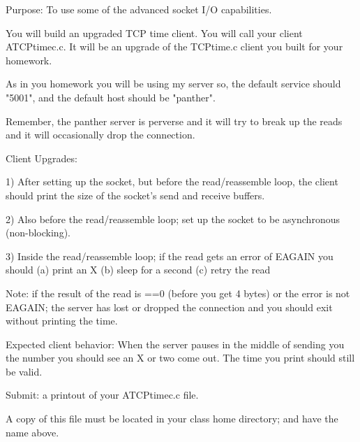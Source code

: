 

\parindent 0pt

Purpose: To use some of the advanced socket I/O capabilities.

You will build an upgraded TCP time client.
You will call your client {\ltt{}ATCPtimec.c}.
It will be an upgrade of the {\ltt{}TCPtime.c} client you built
for your homework.

As in you homework you will be using my server so,
the default service should {\ltt{}"5001"},
and the default host should be {\ltt{}"panther"}.

Remember, the {\ltt{}panther} server is perverse and it will try
to break up the reads and it will occasionally drop the connection.

Client Upgrades:

1) After setting up the socket, but before the read/reassemble loop,
the client should print the size of the socket's
send and receive buffers.

2) Also before the read/reassemble loop; set up the socket to be asynchronous
(non-blocking).

3) Inside the read/reassemble loop; if the read
gets an error of {\ltt{}EAGAIN} you should 
(a) print an {\ltt{}X}
(b) sleep for a second
(c) retry the read

Note: if the result of the read is {\ltt{}==0} (before you get 4 bytes)
or the error is not {\ltt{}EAGAIN}; the server has lost or dropped the
connection and you should exit without printing the time.

Expected client behavior:
When the server pauses in the middle of sending you the number
you should see an {\ltt{}X} or two come out.
The time you print should still be valid.

Submit: a printout of your {\ltt{}ATCPtimec.c} file.

A copy of this file must be located in your class home directory;
and have the name above.

\bye
